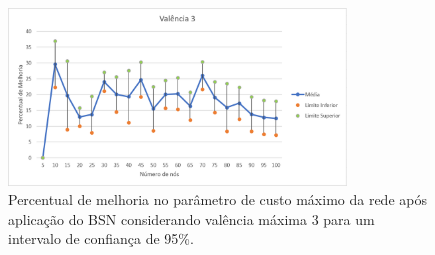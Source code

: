 
\begin{figure} [ht]%
	\centering
	\includegraphics[width=0.8\textwidth]{./figuras/BSN-valencia3-5exec-grafico3.png} %
		\caption[Melhoria de custo máximo com valência 3]{Percentual de melhoria no parâmetro de custo máximo da rede após aplicação do BSN considerando valência máxima 3 para um intervalo de confiança de 95\%.}
		\label{fig_graph_bsn_val3}
\end{figure}

